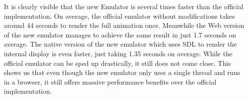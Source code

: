 It is clearly visible that the new Emulator is several times faster than the official implementation.
On average, the official emulator without modifications takes around 44 seconds to render the full animation once. Meanwhile the Web version of the new emulator manages to achieve the same result in just 1.7 seconds on average. The native version of the new emulator which uses SDL to render the internal display is even faster, just taking 1.35 seconds on average. While the official emulator can be sped up drastically, it still does not come close.
This shows us that even though the new emulator only uses a single thread and runs in a browser, it still offers massive performance benefits over the official implementation.
